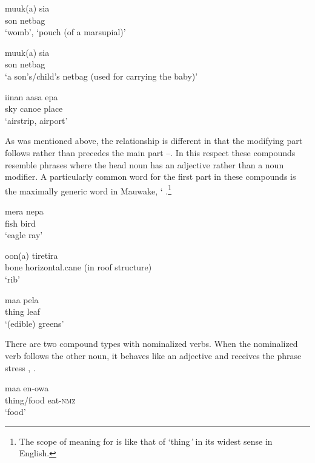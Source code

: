\ea%
\label{ex:3:x45}
\gll muuk(a) sia \\
son netbag\\
\glt`womb', `pouch (of a marsupial)'
\z 
%
%

\ea%
\label{ex:3:x1770}
\gll muuk(a) sia \\
son netbag\\
\glt`a son's/child's netbag (used for carrying the baby)'
\z

\ea%
\label{ex:3:x46}
\gll iinan aasa epa \\
sky canoe place\\
\glt`airstrip, airport'
\z

As was mentioned above, the  relationship is different in that the modifying part follows rather than precedes the main part --. In this respect these compounds resemble phrases where the head noun has an adjective rather than a noun modifier. A particularly common word for the first part in these compounds is the maximally generic word in Mauwake,  ` .\footnote{The scope of meaning for  is like that of `thing\textit{'} in its widest sense in English.}

\ea%
\label{ex:3:x47}
\gll mera nepa \\
fish bird\\
\glt`eagle ray'
\z

\ea%
\label{ex:3:x48}
\gll oon(a) tiretira \\
bone horizontal.cane (in roof structure)\\
\glt`rib'
\z

\ea%
\label{ex:3:x49}
\gll maa pela \\
thing leaf\\
\glt`(edible) greens'
\z

There are two compound types with nominalized verbs. When the nominalized verb follows the other noun, it behaves like an adjective and receives the phrase stress , .

\ea%
\label{ex:3:x1521}
\gll maa en-owa \\
thing/food eat-\textsc{nmz}\\
\glt`food'
\z

